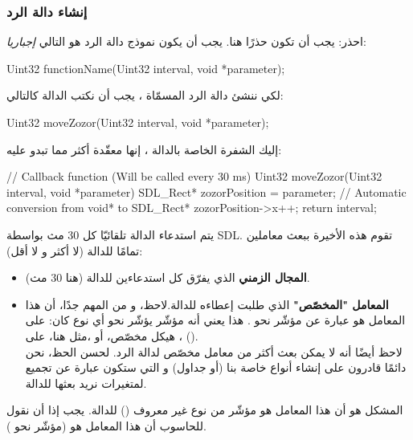 \subsubsection{إنشاء دالة الرد}

احذر: يجب أن تكون حذرًا هنا. يجب أن يكون نموذج دالة الرد هو التالي 
\textit{إجباريا}:

\begin{Csource}
Uint32 functionName(Uint32 interval, void *parameter);
\end{Csource}

لكي ننشئ دالة الرد المسمّاة
،
يجب أن نكتب الدالة كالتالي:

\begin{Csource}
Uint32 moveZozor(Uint32 interval, void *parameter);
\end{Csource}

إليك الشفرة الخاصة بالدالة
،
إنها معقّدة أكثر مما تبدو عليه:

\begin{Csource}
// Callback function (Will be called every 30 ms)
Uint32 moveZozor(Uint32 interval, void *parameter)
{
	SDL_Rect* zozorPosition = parameter; // Automatic conversion from void* to SDL_Rect*
	zozorPosition->x++;
	return interval;
}
\end{Csource}

 يتم استدعاء الدالة 
تلقائيّا كل 30 مث بواسطة \textenglish{SDL}.
تقوم هذه الأخيرة ببعث معاملين تمامًا للدالة (لا أكثر و لا أقل):

\begin{itemize}
	\item \textbf{المجال الزمني}
	الذي يفرّق كل استدعاءين للدالة (هنا 30 مث).
	\item \textbf{المعامل "المخصّص"}
	الذي طلبت إعطاءه للدالة.لاحظ، و من المهم جدًا، أن هذا المعامل هو عبارة عن مؤشّر نحو
	.
	هذا يعني أنه مؤشّر يؤشّر نحو أي نوع كان: على
	،
	هيكل مخصّص، أو ،مثل هنا، على
	 ().\\
لاحظ أيضًا أنه لا يمكن بعث أكثر من معامل مخصّص لدالة الرد. لحسن الحظ، نحن دائمًا قادرون على إنشاء أنواع خاصة بنا (أو جداول) و التي ستكون عبارة عن تجميع لمتغيرات نريد بعثها للدالة.
\end{itemize}

المشكل هو أن هذا المعامل هو مؤشّر من نوع غير معروف
()
للدالة. يجب إذا أن نقول للحاسوب أن هذا المعامل هو
(مؤشّر نحو
).

